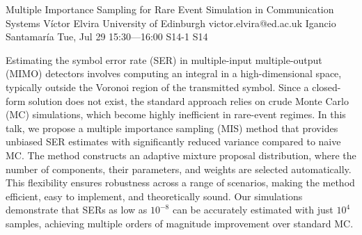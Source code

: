\begin{talk}
  {Multiple Importance Sampling for Rare Event Simulation in Communication Systems}%
  {V\'ictor Elvira}%
  {University of Edinburgh}%
  {victor.elvira@ed.ac.uk}%
  {Igancio Santamar\'ia}%
  {}%
  {Tue, Jul 29 15:30---16:00}%
  {S14-1}%
  {S14}%
  
    
   
Estimating the symbol error rate (SER) in multiple-input multiple-output (MIMO) detectors involves computing an integral in a high-dimensional space, typically outside the Voronoi region of the transmitted symbol. Since a closed-form solution does not exist, the standard approach relies on crude Monte Carlo (MC) simulations, which become highly inefficient in rare-event regimes.  In this talk, we propose a multiple importance sampling (MIS) method that provides unbiased SER estimates with significantly reduced variance compared to naive MC. The method constructs an adaptive mixture proposal distribution, where the number of components, their parameters, and weights are selected automatically. This flexibility ensures robustness across a range of scenarios, making the method efficient, easy to implement, and theoretically sound. Our simulations demonstrate that SERs as low as $10^{-8}$ can be accurately estimated with just $10^4$ samples, achieving multiple orders of magnitude improvement over standard MC.
\medskip


\end{talk}

